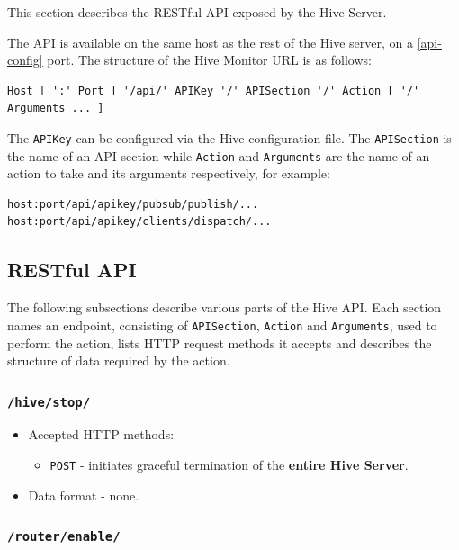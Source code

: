 \documentclass[a4paper]{article}
\begin{document}
This section describes the RESTful API exposed by the Hive Server.

\noindent
The API is available on the same host as the rest of the Hive server, on a \ref{api-config} port. The structure of the Hive Monitor URL is as follows:


\begin{verbatim}
Host [ ':' Port ] '/api/' APIKey '/' APISection '/' Action [ '/' Arguments ... ]
\end{verbatim}




\noindent
The \texttt{APIKey} can be configured via the Hive configuration file. The \texttt{APISection} is the name of an API section while \texttt{Action} and \texttt{Arguments} are the name of an action to take and its arguments respectively, for example:


\begin{verbatim}
host:port/api/apikey/pubsub/publish/...
host:port/api/apikey/clients/dispatch/...
\end{verbatim}
\subsection{RESTful API}
\label{sec-6-1}

The following subsections describe various parts of the Hive API. Each section names an endpoint, consisting of \texttt{APISection}, \texttt{Action} and \texttt{Arguments}, used to perform the action, lists HTTP request methods it accepts and describes the structure of data required by the action.
\subsubsection{\texttt{/hive/stop/}}
\label{sec-6-1-1}
\label{ref-api_stop}


\begin{itemize}
\item Accepted HTTP methods:
\begin{itemize}
\item \texttt{POST} - initiates graceful termination of the \textbf{entire Hive Server}.
\end{itemize}
\item Data format - none.
\end{itemize}
\subsubsection{\texttt{/router/enable/}}
\label{sec-6-1-2}
\end{document}
